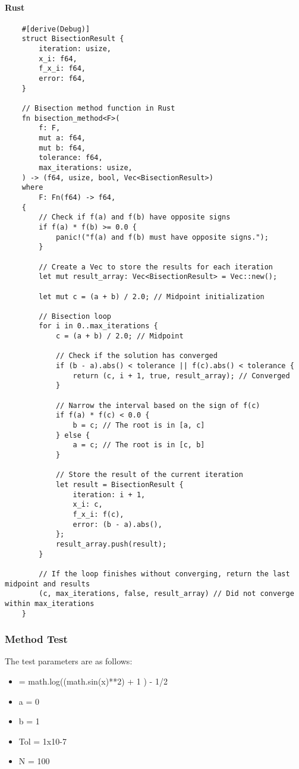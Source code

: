 \documentclass{article}
\begin{document}
    \paragraph{Rust}
    \begin{verbatim}
    #[derive(Debug)]
    struct BisectionResult {
        iteration: usize,
        x_i: f64,
        f_x_i: f64,
        error: f64,
    }

    // Bisection method function in Rust
    fn bisection_method<F>(
        f: F,
        mut a: f64,
        mut b: f64,
        tolerance: f64,
        max_iterations: usize,
    ) -> (f64, usize, bool, Vec<BisectionResult>)
    where
        F: Fn(f64) -> f64,
    {
        // Check if f(a) and f(b) have opposite signs
        if f(a) * f(b) >= 0.0 {
            panic!("f(a) and f(b) must have opposite signs.");
        }

        // Create a Vec to store the results for each iteration
        let mut result_array: Vec<BisectionResult> = Vec::new();

        let mut c = (a + b) / 2.0; // Midpoint initialization

        // Bisection loop
        for i in 0..max_iterations {
            c = (a + b) / 2.0; // Midpoint

            // Check if the solution has converged
            if (b - a).abs() < tolerance || f(c).abs() < tolerance {
                return (c, i + 1, true, result_array); // Converged
            }

            // Narrow the interval based on the sign of f(c)
            if f(a) * f(c) < 0.0 {
                b = c; // The root is in [a, c]
            } else {
                a = c; // The root is in [c, b]
            }

            // Store the result of the current iteration
            let result = BisectionResult {
                iteration: i + 1,
                x_i: c,
                f_x_i: f(c),
                error: (b - a).abs(),
            };
            result_array.push(result);
        }

        // If the loop finishes without converging, return the last midpoint and results
        (c, max_iterations, false, result_array) // Did not converge within max_iterations
    }
    \end{verbatim}

    \subsubsection{Method Test}\label{subsec:method-test}
        The test parameters are as follows:
        \begin{itemize}
            \item {\textflorin = math.log((math.sin(x)**2) + 1 ) - 1/2}
            \item {a = 0}
            \item {b = 1}
            \item {Tol = 1x10-7}
            \item {N = 100}
        \end{itemize}
\end{document}
